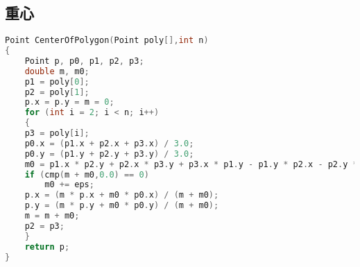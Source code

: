 \subsection{重心}
    \begin{lstlisting}[language=c++]
Point CenterOfPolygon(Point poly[],int n)
{
    Point p, p0, p1, p2, p3;
    double m, m0;
    p1 = poly[0];
    p2 = poly[1];
    p.x = p.y = m = 0;
    for (int i = 2; i < n; i++)
    {
	p3 = poly[i];
	p0.x = (p1.x + p2.x + p3.x) / 3.0;
	p0.y = (p1.y + p2.y + p3.y) / 3.0;
	m0 = p1.x * p2.y + p2.x * p3.y + p3.x * p1.y - p1.y * p2.x - p2.y * p3.x - p3.y * p1.x;
	if (cmp(m + m0,0.0) == 0)
	    m0 += eps;
	p.x = (m * p.x + m0 * p0.x) / (m + m0);
	p.y = (m * p.y + m0 * p0.y) / (m + m0);
	m = m + m0;
	p2 = p3;
    }
    return p;
}
    \end{lstlisting}
